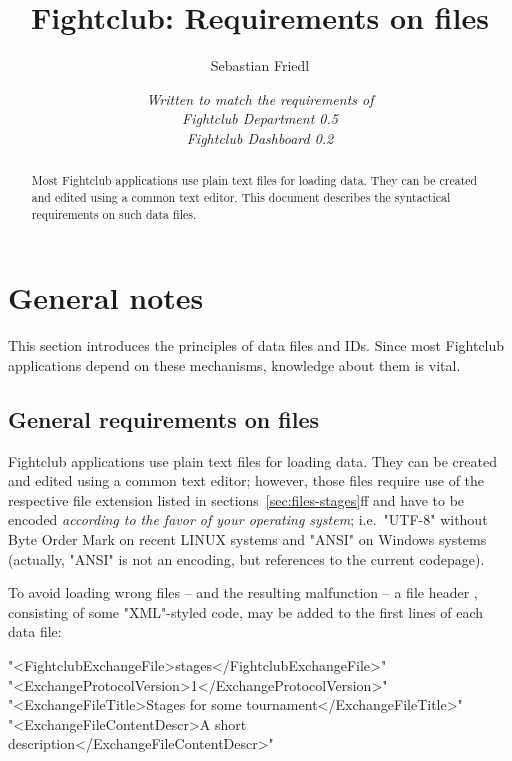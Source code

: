 \documentclass[11pt]{ltxdoc}
\title{\bfseries Fightclub: Requirements on files}
\author{Sebastian Friedl}
\date{\itshape Written to match the requirements of \\
      Fightclub Department 0.5 \\
      Fightclub Dashboard 0.2}
\def\highlight#1{%
    \colorbox{red!15}{#1}%
    \index{\textsf{#1}}}
\begin{document}
    \maketitle
    
    \begin{abstract}\noindent
        Most Fightclub applications use plain text files for loading data. They can be created and edited using a common text editor. This document describes the syntactical requirements on such data files.
    \end{abstract}

    \tableofcontents

    
    
    
    
    \clearpage
    \section{General notes}
    This section introduces the principles of data files and IDs.
    Since most Fightclub applications depend on these mechanisms, knowledge about them is vital.
    
    \subsection{General requirements on files}
    Fightclub applications use plain text files for loading data. They can be created and edited using a common text editor; however, those files require use of the respective file extension listed in sections~\ref{sec:files-stages}ff and have to be encoded \textit{according to the favor of your operating system}; i.e.~"UTF-8" without Byte Order Mark on recent LINUX systems and "ANSI" on Windows systems (actually, "ANSI" is not an encoding, but references to the current codepage).

    \medskip
    To avoid loading wrong files -- and the resulting malfunction -- a \highlight{file header}, consisting of some "XML"-styled code, may be added to the first lines of each data file:
    
    \smallskip
    "<FightclubExchangeFile>stages</FightclubExchangeFile>" \\
    "<ExchangeProtocolVersion>1</ExchangeProtocolVersion>" \\
    "<ExchangeFileTitle>Stages for some tournament</ExchangeFileTitle>" \\
    "<ExchangeFileContentDescr>A short description</ExchangeFileContentDescr>"
    
\end{document}
